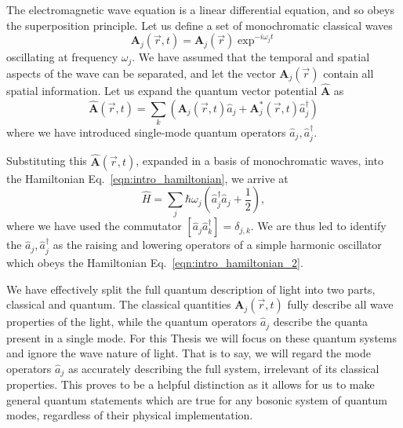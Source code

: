 \noindent The electromagnetic wave equation is a linear differential equation, and so obeys the superposition principle. Let us define a set of monochromatic classical waves
\begin{equation}
\bm{A}_j\left(\overrightarrow{r}, t\right) = \bm{A}_j\left(\overrightarrow{r}\right) \exp^{-i \omega_j t}
\end{equation}
oscillating at frequency $\omega_j$. We have assumed that the temporal and spatial aspects of the wave can be separated, and let the vector $\bm{A}_j\left(\overrightarrow{r}\right)$ contain all spatial information. %
Let us expand the quantum vector potential $\hat{\bm{A}}$ as
\begin{equation}
\hat{\bm{A}}\left(\overrightarrow{r}, t\right) = \sum_k \left( \bm{A}_j\left(\overrightarrow{r}, t\right) \hat{a}_j + \bm{A}_j^* \left(\overrightarrow{r}, t\right) \hat{a}_j^\dagger\right)
\end{equation}
where we have introduced single-mode quantum operators $\hat{a}_j, \hat{a}_j^\dagger$.

Substituting this $\hat{\bm{A}}\left(\overrightarrow{r}, t\right)$, expanded in a basis of monochromatic waves, into the Hamiltonian Eq.~\ref{eqn:intro_hamiltonian}, we arrive at
\begin{equation}\label{eqn:intro_hamiltonian_2}
\hat{H} = \sum_j \hbar \omega_j \left( \hat{a}_j^\dagger \hat{a}_j + \frac{1}{2}\right),
\end{equation}
where we have used the commutator $\left[ \hat{a}_j \hat{a}_k^\dagger \right] = \delta_{j, k}$. We are thus led to identify the $\hat{a}_j, \hat{a}_j^\dagger$ as the raising and lowering operators of a simple harmonic oscillator which obeys the Hamiltonian Eq.~\ref{eqn:intro_hamiltonian_2}. 

We have effectively split the full quantum description of light into two parts, classical and quantum. The classical quantities $\bm{A}_j\left(\overrightarrow{r}, t\right)$ fully describe all wave properties of the light, while the quantum operators $\hat{a}_j$ describe the quanta present in a single mode. For this Thesis we will focus on these quantum systems and ignore the wave nature of light. That is to say, we will regard the mode operators $\hat{a}_j$ as accurately describing the full system, irrelevant of its classical properties. This proves to be a helpful distinction as it allows for us to make general quantum statements which are true for any bosonic system of quantum modes, regardless of their physical implementation.

